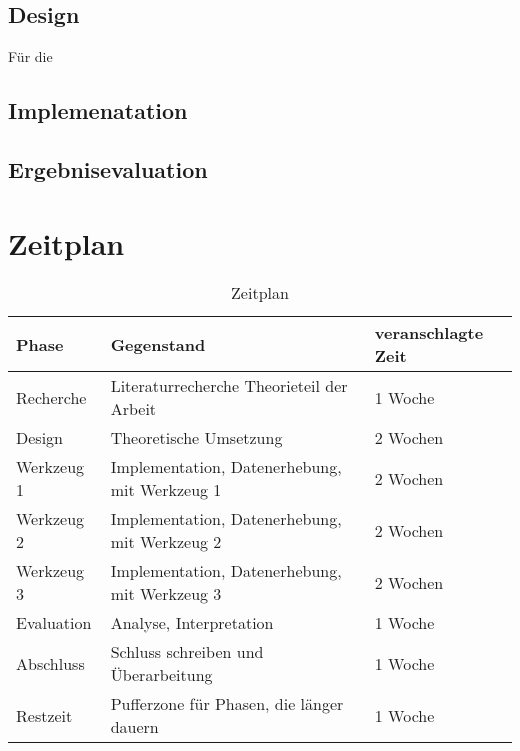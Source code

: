 \documentclass[
	12pt,
	a4paper,
	BCOR10mm,
	DIV14,
	listof=totoc,
	bibliography=totoc,
	headsepline
]{scrreprt}
\begin{document}
\section{Design}
Für die 
\section{Implemenatation}

\section{Ergebnisevaluation}


\chapter{Zeitplan}
\label{Zeitplan}
\begin{table}[h]
\begin{center}
\begin{tabular} {|l|p{4cm}|l|}
	\hline
	\textbf{Phase} & \textbf{Gegenstand} & \textbf{veranschlagte Zeit} \\ \hline
	Recherche & Literaturrecherche \newline Theorieteil der Arbeit & 1 Woche \\ \hline
	Design & Theoretische Umsetzung & 2 Wochen \\ \hline
	Werkzeug 1 & Implementation, \newline Datenerhebung, mit Werkzeug 1 & 2 Wochen \\ \hline
	Werkzeug 2 & Implementation, \newline Datenerhebung, mit Werkzeug 2 & 2 Wochen \\ \hline
	Werkzeug 3 & Implementation, \newline Datenerhebung, mit Werkzeug 3 & 2 Wochen \\ \hline
	Evaluation & Analyse, \newline Interpretation & 1 Woche \\ \hline
	Abschluss & Schluss schreiben und Überarbeitung & 1 Woche \\ \hline
	Restzeit & Pufferzone für Phasen, die länger dauern & 1 Woche \\ \hline
\end{tabular}
\end{center}
\caption{Zeitplan}
\label{tab:timeplan}
\end{table}
\end{document}
